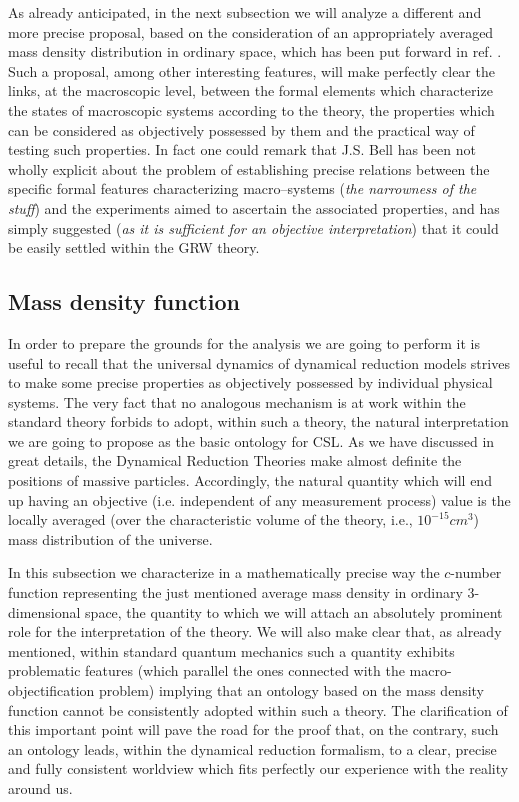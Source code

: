 \documentclass[10pt,a4paper]{article}
\begin{document}
As already anticipated, in
the next subsection we will analyze a different and more precise
proposal, based on the consideration of an appropriately averaged
mass density distribution in ordinary space, which has been put
forward in ref. \cite{cc}. Such a proposal, among other interesting
features, will make perfectly clear the links, at the macroscopic
level, between the formal elements which characterize the states of
macroscopic systems according to the theory, the properties which
can be considered as objectively possessed by them and the
practical way of testing such properties. In fact one could remark
that J.S. Bell has been not wholly explicit about the problem of
establishing precise relations between the specific formal features
characterizing macro--systems (\textit{the narrowness of the stuff}) and
the experiments aimed to ascertain the associated properties, and has
simply suggested (\textit{as it is sufficient for an objective
interpretation}) that it could be easily settled within the GRW theory.


\subsection{Mass density function} \label{sec122}

In order to prepare the grounds for the analysis we are going to
perform it is useful to recall that the universal dynamics of
dynamical reduction models strives to make some precise properties
as objectively possessed by individual physical systems. The very
fact that no analogous mechanism is at work within the standard
theory forbids to adopt, within such a theory, the natural
interpretation we are going to propose as the basic ontology for
CSL. As we have discussed in great details, the Dynamical
Reduction Theories make almost definite the positions of massive
particles. Accordingly, the natural quantity which will end up
having an objective (i.e. independent of any measurement process)
value is the
 locally averaged (over the characteristic volume of the
theory, i.e., $10^{-15} cm^{3}$) mass distribution of the universe.

In this subsection we characterize in a mathematically precise way
the $c$-number function representing the just mentioned average
mass density in ordinary 3-dimensional space, the quantity to
which we will attach an absolutely prominent role for the
interpretation of the theory. We will also make clear that, as
already mentioned, within standard quantum mechanics such a
quantity exhibits problematic features (which parallel the ones
connected with the macro-objectification problem) implying that
an ontology based on the mass density function cannot be
consistently adopted within such a theory. The clarification of
this important point will pave the road for the proof that, on the
contrary, such an ontology leads, within the dynamical reduction
formalism, to a clear, precise and fully consistent worldview
which fits perfectly our experience with the reality around us.
\end{document}
